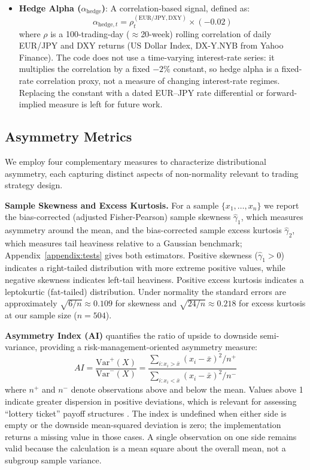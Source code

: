 \documentclass[11pt]{article}
\begin{document}
\begin{itemize}
    \item \textbf{Hedge Alpha ($\alpha_{\text{hedge}}$)}: A correlation-based signal, defined as:
    \begin{equation}
        \alpha_{\text{hedge},t} = \rho_{t}^{(\text{EUR/JPY}, \text{DXY})} \times (-0.02)
    \end{equation}
    where $\rho$ is a 100-trading-day ($\approx$20-week) rolling correlation of daily EUR/JPY and DXY returns (US Dollar Index, DX-Y.NYB from Yahoo Finance). The code does not use a time-varying interest-rate series: it multiplies the correlation by a fixed $-2\%$ constant, so hedge alpha is a fixed-rate correlation proxy, not a measure of changing interest-rate regimes. Replacing the constant with a dated EUR--JPY rate differential or forward-implied measure is left for future work.
\end{itemize}

\subsection{Asymmetry Metrics}
\label{sec:asymmetrymetrics}

We employ four complementary measures to characterize distributional asymmetry, each capturing distinct aspects of non-normality relevant to trading strategy design.

\textbf{Sample Skewness and Excess Kurtosis.} For a sample $\{x_1, \ldots, x_n\}$ we report the bias-corrected (adjusted Fisher-Pearson) sample skewness $\hat{\gamma}_1$, which measures asymmetry around the mean, and the bias-corrected sample excess kurtosis $\hat{\gamma}_2$, which measures tail heaviness relative to a Gaussian benchmark; Appendix~\ref{appendix:tests} gives both estimators. Positive skewness ($\hat{\gamma}_1 > 0$) indicates a right-tailed distribution with more extreme positive values, while negative skewness indicates left-tail heaviness. Positive excess kurtosis indicates a leptokurtic (fat-tailed) distribution. Under normality the standard errors are approximately $\sqrt{6/n} \approx 0.109$ for skewness and $\sqrt{24/n} \approx 0.218$ for excess kurtosis at our sample size ($n = 504$).

\textbf{Asymmetry Index (AI)} quantifies the ratio of upside to downside semi-variance, providing a risk-management-oriented asymmetry measure:
\begin{equation}
    AI = \frac{\text{Var}^+(X)}{\text{Var}^-(X)} = \frac{\sum_{i: x_i > \bar{x}} (x_i - \bar{x})^2 / n^+}{\sum_{i: x_i < \bar{x}} (x_i - \bar{x})^2 / n^-}
    \label{eq:ai}
\end{equation}
where $n^+$ and $n^-$ denote observations above and below the mean. Values above 1 indicate greater dispersion in positive deviations, which is relevant for assessing ``lottery ticket'' payoff structures \citep{bali2011maxing}.
The index is undefined when either side is empty or the downside mean-squared deviation is zero; the implementation returns a missing value in those cases. A single observation on one side remains valid because the calculation is a mean square about the overall mean, not a subgroup sample variance.
\end{document}
